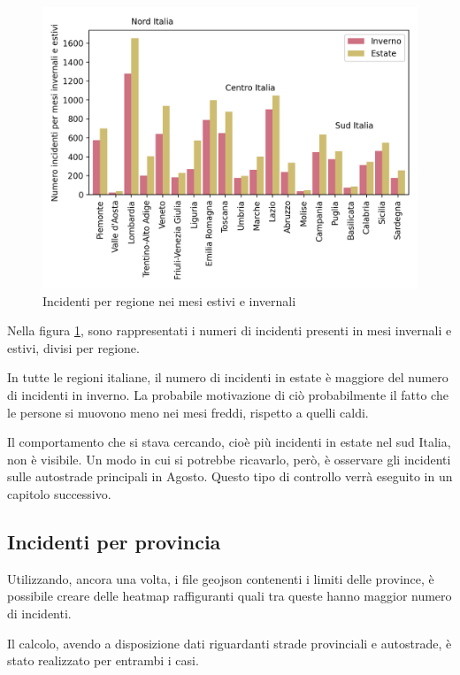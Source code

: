 \documentclass[a4paper]{report}
\begin{document}
\begin{figure}
    \includegraphics[width=\linewidth]{../src/incidenti/incidenti_aci/mappe_regioni/estate_inverno.png}
    \caption{Incidenti per regione nei mesi estivi e invernali}
    \label{fig:estate-inverno}
\end{figure}

Nella figura \ref{fig:estate-inverno}, sono rappresentati i numeri di incidenti presenti 
in mesi invernali e estivi, divisi per regione.

In tutte le regioni italiane, il numero di incidenti in estate è maggiore del numero di 
incidenti in inverno. La probabile motivazione di ciò probabilmente il fatto che le persone 
si muovono meno nei mesi freddi, rispetto a quelli caldi.

Il comportamento che si stava cercando, cioè più incidenti in estate nel 
sud Italia, non è visibile. 
Un modo in cui si potrebbe ricavarlo, però, è osservare gli incidenti sulle autostrade 
principali in Agosto.
Questo tipo di controllo verrà eseguito in un capitolo successivo.


\subsection{Incidenti per provincia}

Utilizzando, ancora una volta, i file geojson contenenti i limiti delle province, è 
possibile creare delle heatmap raffiguranti quali tra queste hanno maggior numero 
di incidenti.

Il calcolo, avendo a disposizione dati riguardanti strade provinciali e autostrade, 
è stato realizzato per entrambi i casi.
\end{document}
